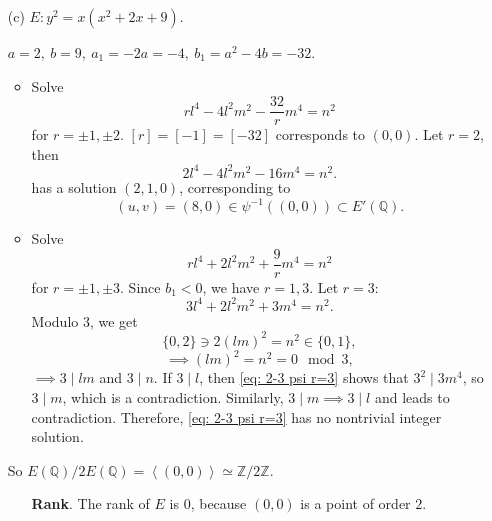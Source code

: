 \documentclass{article}
\theoremstyle{definition}
\theoremstyle{remark}
\newcommand{\Q}{\mathbb{Q}}
\newcommand{\Z}{\mathbb{Z}}
\newcommand{\gene}[1]{\left\langle #1 \right\rangle} %
\begin{document}
\begin{enumerate}
\item [(c)] $E:y^2=x(x^2+2x+9)$.\par
$a = 2,\ b = 9,\ a_1 = -2a = -4,\ b_1 = a^2-4b = -32$.
\begin{itemize}
\item Solve \begin{equation}
    rl^4 - 4l^2m^2  - \frac{32}{r} m^4 = n^2
\end{equation}
for $r = \pm1, \pm2$.
$[r] = [-1] = [-32]$ corresponds to $(0, 0)$.
Let $r = 2$, then
\begin{equation}\label{eq: 2-3 phi r=2}
    2l^4 - 4l^2m^2 - 16m^4 = n^2.
\end{equation}
has a solution $(2, 1, 0)$,
corresponding to \[(u, v) = \left( 8,0 \right)\in\psi^{-1}((0, 0))\subset E'(\Q).\]

\item Solve\begin{equation}
    rl^4 + 2l^2m^2 + \frac{9}{r}m^4 = n^2
\end{equation}
for $r = \pm 1, \pm 3$.
Since $b_1 < 0$, we have $r = 1, 3$.
Let $r = 3$:
\begin{equation}\label{eq: 2-3 psi r=3}
    3l^4 + 2l^2m^2 + 3m^4 = n^2.
\end{equation}
Modulo $3$, we get \[\{0, 2\}\ni 2(lm)^2 = n^2\in\{0, 1\},\]
\[\implies (lm)^2 = n^2 = 0\mod 3,\]
$\implies 3\mid lm$ and $3\mid n$.
If $3\mid l$, then \cref{eq: 2-3 psi r=3} shows that $3^2\mid 3m^4$, so $3\mid m$, which is a contradiction. Similarly, $3\mid m\implies 3\mid l$ and leads to contradiction.
Therefore, \cref{eq: 2-3 psi r=3} has no nontrivial integer solution.
\end{itemize}
So $E(\Q)/2E(\Q) = \gene{(0, 0)}\simeq \Z/2\Z$.
\begin{itemize}
\item [\textbf{Rank}.]
The rank of $E$ is $0$, because $(0, 0)$ is a point of order $2$.
\end{itemize}

\end{enumerate}
\end{document}
